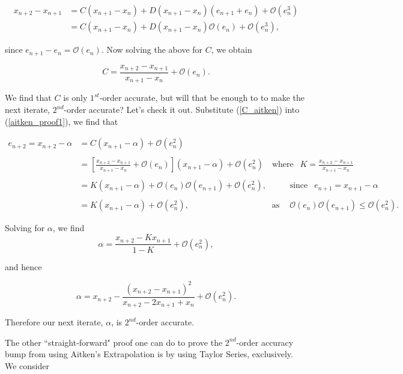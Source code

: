 \documentclass[paper=a4, fontsize=11pt]{scrartcl} %
\numberwithin{equation}{section} %
\numberwithin{figure}{section} %
\numberwithin{table}{section} %
\begin{document}
\begin{align*}
x_{n+2}-x_{n+1} &= C(x_{n+1}-x_{n}) +D(x_{n+1}-x_n)(e_{n+1}+e_{n}) + \mathcal{O}(e_{n}^3) \\
	&= C(x_{n+1}-x_{n}) +D(x_{n+1}-x_n)\mathcal{O}(e_{n}) + \mathcal{O}(e_{n}^3),
\end{align*}

since $e_{n+1}-e_{n} = \mathcal{O}(e_{n})$. Now solving the above for $C$, we obtain

\begin{equation}
\label{C_aitken}C = \frac{ x_{n+2}-x_{n+1}  }{ x_{n+1} - x_n } + \mathcal{O}(e_{n}).
\end{equation}

We find that $C$ is only $1^{st}$-order accurate, but will that be enough to to make the next iterate, $2^{nd}$-order accurate? Let's check it out. Substitute (\ref{C_aitken}) into (\ref{aitken_proof1}), we find that

\begin{align*}
e_{n+2} = x_{n+2} - \alpha &= C(x_{n+1}-\alpha) + \mathcal{O}(e_{n}^2) \\ \\
	&= \left[ \frac{x_{n+2}-x_{n+1} }{ x_{n+1} - x_n } + \mathcal{O}(e_{n})    \right]( x_{n+1} - \alpha ) + \mathcal{O}(e_{n}^2) \ \ \ \mbox{ where } \ \ K = \frac{x_{n+2}-x_{n+1} }{ x_{n+1} - x_n }  \\ \\
	&= K(x_{n+1} - \alpha) + \mathcal{O}(e_{n})\mathcal{O}(e_{n+1}) + \mathcal{O}(e_{n}^2),\ \ \ \ \ \ \ \  \ \ \ \mbox{ since } \ \ e_{n+1} = x_{n+1}-\alpha \\ \\
	&= K(x_{n+1} - \alpha) + \mathcal{O}(e_{n}^2),\ \ \ \ \ \ \ \ \ \ \ \ \ \ \ \ \ \ \ \ \ \ \ \ \ \ \ \ \ \ \ \ \ \ \ \ \ \ \ \ \ \ \ \mbox{ as }\ \ \ \	 \mathcal{O}(e_{n})\mathcal{O}(e_{n+1}) \leq \mathcal{O}(e_{n}^2).	
\end{align*}

Solving for $\alpha$, we find 
$$\alpha = \frac{  x_{n+2} - Kx_{n+1} }{ 1 - K } +  \mathcal{O}(e_{n}^2),$$

and hence

$$\alpha = x_{n+2} - \frac{  (x_{n+2}-x_{n+1})^2 }{ x_{n+2} - 2x_{n+1} + x_n } + \mathcal{O}(e_{n}^2).$$

Therefore our next iterate, $\alpha$,  is $2^{nd}$-order accurate.

The other ``straight-forward" proof one can do to prove the $2^{nd}$-order accuracy bump from using Aitken's Extrapolation is by using Taylor Series, exclusively. We consider 
\end{document}
